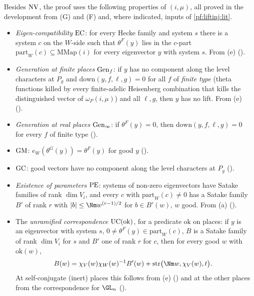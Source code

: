 Besides $\mathrm{NV}$, the proof uses the following properties of $(i,\mu)$, all proved in the development from (G) and (F) and, where indicated,
inputs of \cref{pf:liftinj:lit}.
\begin{itemize}
\item \emph{Eigen-compatibility} $\mathrm{EC}$: for every Hecke family and system $s$ there is a system $c$ on the $W$-side such that $\theta^F(y)$
lies in the $c$-part $\mathrm{part}_W(c)\subseteq\mathrm{MMap}(i)$ for every eigenvector $y$ with system $s$. From (e)
().
\item \emph{Generation at finite places} $\mathrm{Gen}_f$: if $y$ has no component along the level characters at $P_g$ and
$\mathrm{down}(y,f,\ell,g)=0$ for all $f$ of \emph{finite type} (theta functions killed by every finite-adelic Heisenberg combination that kills the
distinguished vector of $\omega_P(i,\mu)$) and all $\ell,g$, then $y$ has no lift. From (e) ().
\item \emph{Generation at real places} $\mathrm{Gen}_\infty$: if $\theta^F(y)=0$, then $\mathrm{down}(y,f,\ell,g)=0$ for every $f$ of finite type
().
\item $\mathrm{GM}$: $e_W(\theta^G(y))=\theta^F(y)$ for good $y$ ().
\item $\mathrm{GC}$: good vectors have no component along the level characters at $P_g$ ().
\item \emph{Existence of parameters} $\mathrm{PE}$: systems of non-zero eigenvectors have Satake families of rank $\dim V_i$, and every $c$ with
$\mathrm{part}_W(c)\ne0$ has a Satake family $B'$ of rank $r$ with $|b|\le\Nm w^{(r-1)/2}$ for $b\in B'(w)$, $w$ good. From (a)
().
\item The \emph{unramified correspondence} $\mathrm{UC}(\mathrm{ok})$, for a predicate $\mathrm{ok}$ on places: if $y$ is an eigenvector with system $s$,
$0\ne\theta^F(y)\in\mathrm{part}_W(c)$, $B$ is a Satake family of rank $\dim V_i$ for $s$ and $B'$ one of rank $r$ for $c$, then for every good $w$
with $\mathrm{ok}(w)$,
\begin{equation}\label{eq:pf:liftinj:unr}
B(w)=\chi_V(w)\chi_W(w)^{-1}B'(w)+\liftinjstr\bigl(\Nm w,\chi_V(w),t\bigr).
\end{equation}
At self-conjugate (inert) places this follows from (e) () and at the other places from the
correspondence for $\GL_n$ ().
\end{itemize}
